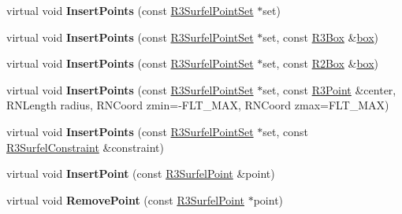 \begin{DoxyCompactItemize}
\item 
virtual void {\bfseries Insert\+Points} (const \hyperlink{class_r3_surfel_point_set}{R3\+Surfel\+Point\+Set} $\ast$set)\hypertarget{class_r3_surfel_point_set_af609466c1f4fbe6d17049338c5df2579}{}\label{class_r3_surfel_point_set_af609466c1f4fbe6d17049338c5df2579}

\item 
virtual void {\bfseries Insert\+Points} (const \hyperlink{class_r3_surfel_point_set}{R3\+Surfel\+Point\+Set} $\ast$set, const \hyperlink{class_r3_box}{R3\+Box} \&\hyperlink{structbox}{box})\hypertarget{class_r3_surfel_point_set_a4f8f4b37d965bfab32c5abc6d398c357}{}\label{class_r3_surfel_point_set_a4f8f4b37d965bfab32c5abc6d398c357}

\item 
virtual void {\bfseries Insert\+Points} (const \hyperlink{class_r3_surfel_point_set}{R3\+Surfel\+Point\+Set} $\ast$set, const \hyperlink{class_r2_box}{R2\+Box} \&\hyperlink{structbox}{box})\hypertarget{class_r3_surfel_point_set_a3ddf6c4771ad22ec8ef5b4934512d7c3}{}\label{class_r3_surfel_point_set_a3ddf6c4771ad22ec8ef5b4934512d7c3}

\item 
virtual void {\bfseries Insert\+Points} (const \hyperlink{class_r3_surfel_point_set}{R3\+Surfel\+Point\+Set} $\ast$set, const \hyperlink{class_r3_point}{R3\+Point} \&center, R\+N\+Length radius, R\+N\+Coord zmin=-\/F\+L\+T\+\_\+\+M\+AX, R\+N\+Coord zmax=F\+L\+T\+\_\+\+M\+AX)\hypertarget{class_r3_surfel_point_set_ae1670a44b2d9dd8555bdc6ecca49a648}{}\label{class_r3_surfel_point_set_ae1670a44b2d9dd8555bdc6ecca49a648}

\item 
virtual void {\bfseries Insert\+Points} (const \hyperlink{class_r3_surfel_point_set}{R3\+Surfel\+Point\+Set} $\ast$set, const \hyperlink{class_r3_surfel_constraint}{R3\+Surfel\+Constraint} \&constraint)\hypertarget{class_r3_surfel_point_set_ac29db891a4b2096c26864fe8e4c830c9}{}\label{class_r3_surfel_point_set_ac29db891a4b2096c26864fe8e4c830c9}

\item 
virtual void {\bfseries Insert\+Point} (const \hyperlink{class_r3_surfel_point}{R3\+Surfel\+Point} \&point)\hypertarget{class_r3_surfel_point_set_a684db9d54fc1ad7d8eed0327de40f025}{}\label{class_r3_surfel_point_set_a684db9d54fc1ad7d8eed0327de40f025}

\item 
virtual void {\bfseries Remove\+Point} (const \hyperlink{class_r3_surfel_point}{R3\+Surfel\+Point} $\ast$point)\hypertarget{class_r3_surfel_point_set_aab5f95d3cc3e59f1609af86fae6ed4e7}{}\label{class_r3_surfel_point_set_aab5f95d3cc3e59f1609af86fae6ed4e7}


\end{DoxyCompactItemize}
